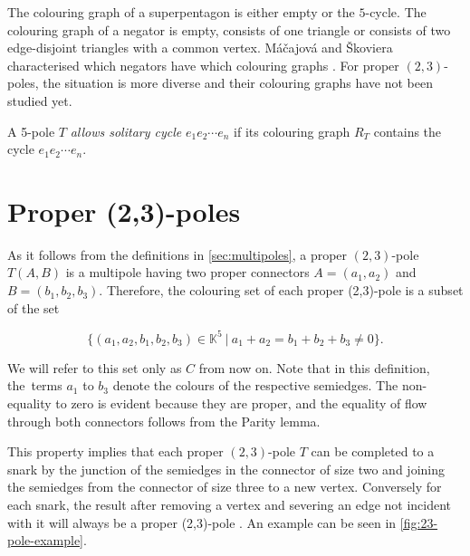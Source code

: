 The colouring graph of a superpentagon is either empty or the $5$-cycle. The colouring graph of a negator is empty, consists of one triangle or consists of two edge-disjoint triangles with a common vertex.
Máčajová and Škoviera characterised which negators have which colouring graphs \cite{IrreducibleSnarksSkoviera}.
For proper $(2,3)$-poles, the situation is more diverse and their colouring graphs have not been studied yet.


A 5-pole $T$ \textit{allows solitary cycle} $e_1e_2\cdots e_n$ if its colouring graph $R_T$ contains the cycle $e_1e_2\cdots e_n$.


\section{Proper (2,3)-poles}\label{ch:proper-23-poles}

As it follows from the definitions in \cref{sec:multipoles}, a proper $(2,3)$-pole $T(A,B)$ is a multipole having two proper connectors $A=(a_1,a_2)$ and $B=(b_1,b_2,b_3)$. Therefore, the colouring set of each proper (2,3)-pole is a subset of the set

$$\{(a_1,a_2,b_1,b_2,b_3)\in\mathbb{K}^5~|~a_1+a_2=b_1+b_2+b_3\neq 0\}.$$

We will refer to this set only as $C$ from now on. Note that in this definition, the~terms $a_1$ to $b_3$ denote the colours of the respective semiedges. The non-equality to zero is evident because they are proper, and the equality of flow through both connectors follows from the Parity lemma.

This property implies that each proper $(2,3)$-pole $T$ can be completed to a snark by the junction of the semiedges in the connector of size two and joining the semiedges from the connector of size three to a new vertex. Conversely for each snark, the result after removing a vertex and severing an edge not incident with it will always be a proper (2,3)-pole \cite{MorphologyOfSmall}.
An example can be seen in \cref{fig:23-pole-example}.

